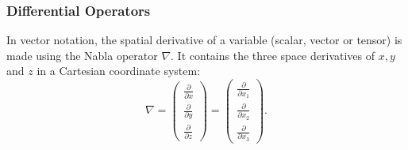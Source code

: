 \documentclass[MathematicsNumericsDerivationsAndOpenFOAM.tex]{subfiles}
\begin{document}
\subsubsection{Differential Operators}
%
%
	In vector notation, the spatial derivative of a variable (scalar, vector
    or tensor) is made using the Nabla operator $\nabla$. It contains the three
    space derivatives of $x, y$ and $z$ in a Cartesian coordinate system:
%
%
$$
  \nabla
=
  \left(
  \begin{matrix}
    \frac{\partial}{\partial x} \\
    \frac{\partial}{\partial y} \\
    \frac{\partial}{\partial z}
  \end{matrix}
  \right)
=
  \left(
  \begin{matrix}
    \frac{\partial}{\partial x_1} \\
    \frac{\partial}{\partial x_2} \\
    \frac{\partial}{\partial x_3}
  \end{matrix}
  \right) .
$$
%
%
%
%
\end{document}

